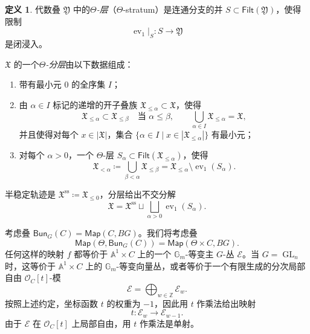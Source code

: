 \documentclass{amsart}
\theoremstyle{definition}
\newtheorem{defn}[thm]{定义}
\theoremstyle{remark}
\theoremstyle{plain}
\theoremstyle{definition}
\theoremstyle{remark}
\newcommand{\A}{\mathbb{A}}
\newcommand{\G}{\mathbb{G}}
\newcommand{\Z}{\mathbb{Z}}
\newcommand{\mc}[1]{\mathcal{#1}}
\newcommand{\mf}[1]{\mathfrak{#1}}
\newcommand{\mr}[1]{\mathrm{#1}}
\newcommand{\on}[1]{\operatorname{#1}}
\newcommand{\ms}[1]{\mathsf{#1}}
\newcommand{\1}{\mathbf{1}}
\newcommand{\2}{\mathbf{2}}
\newcommand{\3}{\mathbf{3}}
\DeclareMathOperator{\ev}{ev}
\begin{document}
\begin{defn}
    代数叠 \(\mf{Y}\) 中的\textit{\(\Theta\)-层}（\(\Theta\)-stratum）是连通分支的并 \(S\subset\ms{Filt}(\mf{Y})\)，使得限制
    \[
        \ev_1|_S\colon S\longrightarrow\mf{Y}
    \]
    是闭浸入。

    \(\mf{X}\) 的一个\textit{\(\Theta\)-分层}由以下数据组成：
    \begin{enumerate}
        \item 带有最小元 \(0\) 的全序集 \(I\)；
        \item 由 \(\alpha\in I\) 标记的递增的开子叠族 \(\mf{X}_{\leq\alpha}\subset\mf{X}\)，使得
        \[
            \mf{X}_{\leq\alpha}\subset\mf{X}_{\leq\beta}
            \quad\text{当 }\alpha\leq\beta,
            \qquad
            \bigcup_{\alpha\in I}\mf{X}_{\leq\alpha}=\mf{X},
        \]
        并且使得对每个 \(x\in|\mf{X}|\)，集合 \(\{\alpha\in I\mid x\in|\mf{X}_{\leq\alpha}|\}\) 有最小元；
        \item 对每个 \(\alpha>0\)，一个 \(\Theta\)-层 \(S_\alpha\subset\ms{Filt}(\mf{X}_{\leq\alpha})\)，使得
        \[
            \mf{X}_{<\alpha}
            \coloneqq
            \bigcup_{\beta<\alpha}\mf{X}_{\leq\beta}
            =
            \mf{X}_{\leq\alpha}\setminus\ev_1(S_\alpha).
        \]
    \end{enumerate}
    半稳定轨迹是 \(\mf{X}^{\mr{ss}}\coloneqq\mf{X}_{\leq0}\)，分层给出不交分解
    \[
        \mf{X}
        =
        \mf{X}^{\mr{ss}}
        \sqcup
        \bigsqcup_{\alpha>0}\ev_1(S_\alpha).
    \]
\end{defn}

考虑叠 \(\ms{Bun}_G(C) = \ms{Map}(C, BG)\)。我们将考虑叠
\[ \ms{Map}(\Theta, \ms{Bun}_G(C)) = \ms{Map}(\Theta \times C, BG). \]
任何这样的映射 \(f\) 都等价于 \(\A^1\times C\) 上的一个 \(\G_m\)-等变主 \(G\)-丛 \(\mc{E}\)。当 \(G=\on{GL}_n\) 时，这等价于 \(\A^1\times C\) 上的 \(\G_m\)-等变向量丛，或者等价于一个有限生成的分次局部自由 \(\mc{O}_C[t]\)-模
\[
    \mc{E}=\bigoplus_{w\in\Z}\mc{E}_w.
\]
按照上述约定，坐标函数 \(t\) 的权重为 \(-1\)，因此用 \(t\) 作乘法给出映射
\[
    t\colon\mc{E}_w\longrightarrow\mc{E}_{w-1}.
\]
由于 \(\mc{E}\) 在 \(\mc{O}_C[t]\) 上局部自由，用 \(t\) 作乘法是单射。
\end{document}

